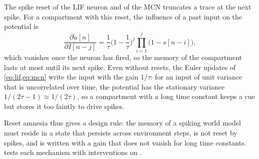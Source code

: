 The spike reset of the LIF neuron and of the MCN truncates a trace at the next spike.
For a compartment with this reset, the influence of a past input on the potential is
\begin{equation}
\frac{\partial \tilde u[n]}{\partial I[n-j]} = \frac{1}{\tau}\Big(1-\frac{1}{\tau}\Big)^{j}\prod_{i=1}^{j}\big(1-s[n-i]\big),
\label{eq:spike_reset}
\end{equation}
which vanishes once the neuron has fired, so the memory of the compartment lasts at most until its next spike.
Even without resets, the Euler updates of \cref{eq:lif,eq:mcn} write the input with the gain $1/\tau$: for an input of unit variance that is uncorrelated over time, the potential has the stationary variance $1/(2\tau-1)\approx1/(2\tau)$, so a compartment with a long time constant keeps a cue but stores it too faintly to drive spikes.

Reset amnesia thus gives a design rule: the memory of a spiking world model must reside in a state that persists across environment steps, is not reset by spikes, and is written with a gain that does not vanish for long time constants.
 tests each mechanism with interventions on \swm.
